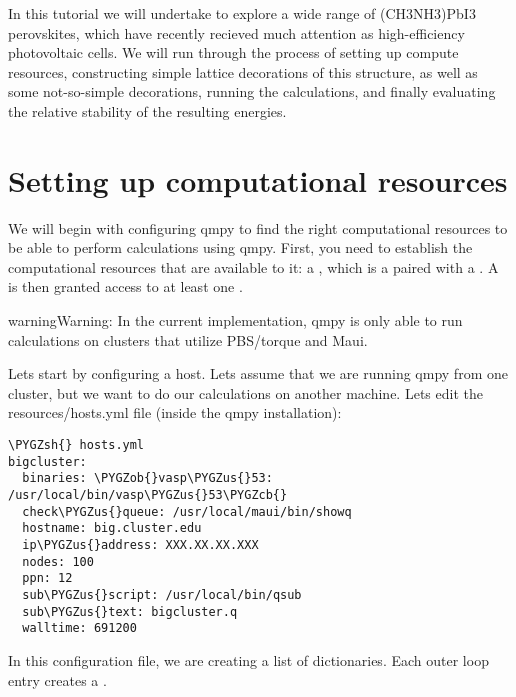 \documentclass[letterpaper,10pt,english]{sphinxmanual}
\def\PYGZus{\char`\_}
\def\PYGZob{\char`\{}
\def\PYGZcb{\char`\}}
\def\PYGZsh{\char`\#}
\begin{document}
In this tutorial we will undertake to explore a wide range of (CH3NH3)PbI3
perovskites, which have recently recieved much attention as high-efficiency
photovoltaic cells. We will run through the process of setting up compute
resources, constructing simple lattice decorations of this structure, as well
as some not-so-simple decorations, running the calculations, and finally
evaluating the relative stability of the resulting energies.


\section{Setting up computational resources}
\label{project:setting-up-computational-resources}
We will begin with configuring qmpy to find the right computational resources
to be able to perform calculations using qmpy. First, you need to establish the
computational resources that are available to it: a {\hyperref[models:qmpy.Account]{}}, which is a
{\hyperref[models:qmpy.Host]{}} paired with a {\hyperref[models:qmpy.User]{}}. A {\hyperref[models:qmpy.Account]{}} is then granted
access to at least one {\hyperref[models:qmpy.Allocation]{}}.

\begin{notice}{warning}{Warning:}
In the current implementation, qmpy is only able to run calculations on
clusters that utilize PBS/torque and Maui.
\end{notice}

Lets start by configuring a host. Lets assume that we are running qmpy from one
cluster, but we want to do our calculations on another machine. Lets edit the
resources/hosts.yml file (inside the qmpy installation):

\begin{Verbatim}[commandchars=\\\{\}]
\PYGZsh{} hosts.yml
bigcluster:
  binaries: \PYGZob{}vasp\PYGZus{}53: /usr/local/bin/vasp\PYGZus{}53\PYGZcb{}
  check\PYGZus{}queue: /usr/local/maui/bin/showq
  hostname: big.cluster.edu
  ip\PYGZus{}address: XXX.XX.XX.XXX
  nodes: 100
  ppn: 12
  sub\PYGZus{}script: /usr/local/bin/qsub
  sub\PYGZus{}text: bigcluster.q
  walltime: 691200
\end{Verbatim}

In this configuration file, we are creating a list of dictionaries. Each outer
loop entry creates a {\hyperref[models:qmpy.Host]{}}.
\end{document}
